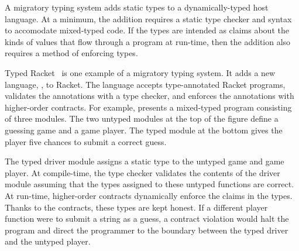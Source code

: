 A migratory typing system adds static types to a
dynamically-typed host language.
At a minimum, the addition requires a static type checker and
syntax to accomodate mixed-typed code.
If the types are intended as claims about the kinds of values that
flow through a program at run-time, then the addition also requires a method
of enforcing types.

Typed Racket~\cite{tf-popl-2008} is one example of a migratory typing system.
It adds a new language, , to Racket.
The language accepts type-annotated Racket programs,
validates the annotations with a type checker,
and enforces the annotations with higher-order contracts.
For example,  presents a mixed-typed
program consisting of three modules.
The two untyped modules at the top of the figure define a guessing game
and a game player.
The typed module at the bottom gives the player five chances to submit a
correct guess.

The typed driver module assigns a static type to the untyped game and
 game player.
At compile-time, the type checker validates the contents of the driver module
 assuming that the types assigned to these untyped functions are correct.
At run-time, higher-order contracts dynamically enforce the claims in the types.
Thanks to the contracts, these types are kept honest.
If a different player function were to submit a string as a guess, a contract
 violation would halt the program and direct the programmer to the boundary
 between the typed driver and the untyped player.

